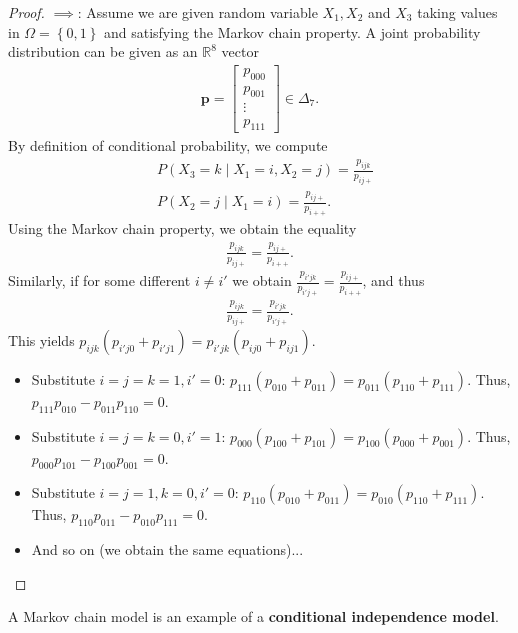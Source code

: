 \documentclass[a4paper, 11pt]{article}
\begin{document}
\begin{proof}[Proof]
  \( \implies \): 
  Assume we are given random variable \( X_1, X_2 \) and \( X_3 \) taking values in \( \Omega = \left\{ 0,1 \right\} \) and satisfying the Markov chain property. A joint probability distribution can be given as an \( \mathbb{R}^8 \) vector 
  \begin{align*}
    \mathbf p = \begin{bmatrix}
      p_{000} \\ p_{001} \\ \vdots \\ p_{111}
    \end{bmatrix} \in \Delta_7.
  \end{align*}
  By definition of conditional probability, we compute
  \begin{align*}
    &P(X_3 = k \mid X_1 = i, X_2 = j) = \frac{p_{ijk}}{p_{ij+}} \\
    &P(X_2 = j \mid X_1 = i) = \frac{p_{ij+}}{p_{i++}}.
  \end{align*}
  Using the Markov chain property, we obtain the equality 
  \begin{align*}
    \frac{p_{ijk}}{p_{ij+}} =  \frac{p_{ij+}}{p_{i++}}.
  \end{align*}
  Similarly, if for some different \( i \neq i' \) we obtain \( \frac{p_{i'jk}}{p_{i'j+}} =  \frac{p_{ij+}}{p_{i++}} \), and thus 
  \begin{align*}
    \frac{p_{ijk}}{p_{ij+}} = \frac{p_{i'jk}}{p_{i'j+}}.
  \end{align*}
  This yields \( p_{ijk} (p_{i'j0} + p_{i'j1}) = p_{i'jk} (p_{ij0} + p_{ij1}) \).
  \begin{itemize}
    \item Substitute \( i=j=k=1, i' = 0 \): \( p_{111}(p_{010} + p_{011}) = p_{011}(p_{110} + p_{111}) \). Thus, \( p_{111}p_{010} - p_{011}p_{110} = 0 \).
    \item Substitute \( i=j=k=0, i' = 1 \): \( p_{000}(p_{100} + p_{101}) = p_{100}(p_{000} + p_{001}) \). Thus, \( p_{000}p_{101} - p_{100}p_{001} = 0 \).
    \item Substitute \( i=j=1, k=0, i' = 0 \): \( p_{110}(p_{010} + p_{011}) = p_{010}(p_{110} + p_{111}) \). Thus, \( p_{110}p_{011} - p_{010}p_{111} = 0 \).
    \item And so on (we obtain the same equations)...
  \end{itemize}
\end{proof}

\begin{remark}
  A Markov chain model is an example of a \textbf{conditional independence model}.
\end{remark}
\end{document}
